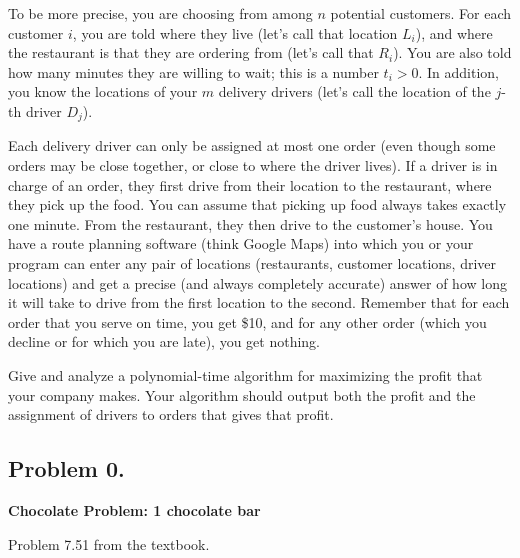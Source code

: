 \documentclass[10pt]{article}
\begin{document}
To be more precise, you are choosing from among $n$ potential customers. For each customer $i$, you are told where they live (let's call that location $L_i$), and where the restaurant is that they are ordering from (let's call that $R_i$). You are also told how many minutes they are willing to wait; this is a number $t_i > 0$. In addition, you know the locations of your $m$ delivery drivers (let's call the location of the $j$-th driver $D_j$).

Each delivery driver can only be assigned at most one order (even though some orders may be close together, or close to where the driver lives).
If a driver is in charge of an order, they first drive from their location to the restaurant, where they pick up the food. You can assume that picking up food always takes exactly one minute. From the restaurant, they then drive to the customer's house.
You have a route planning software (think Google Maps) into which you or your program can enter any pair of locations (restaurants, customer locations, driver locations) and get a precise (and always completely accurate) answer of how long it will take to drive from the first location to the second.
Remember that for each order that you serve on time, you get \$10, and for any other order (which you decline or for which you are late), you get nothing.

Give and analyze a polynomial-time algorithm for maximizing the profit that your company makes. Your algorithm should output both the profit and the assignment of drivers to orders that gives that profit.

\subsection*{Problem 0.}
\textbf{Chocolate Problem: 1 chocolate bar}

Problem 7.51 from the textbook.
\end{document}
